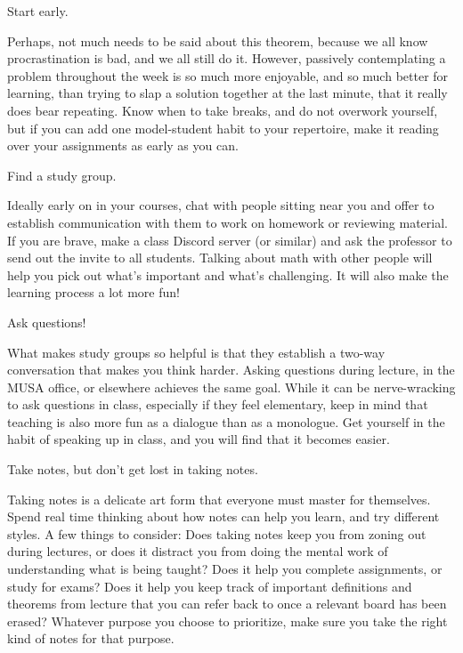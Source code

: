 \documentclass[../notes.tex]{subfiles}
\begin{document}
\begin{proposition}
    Start early.
\end{proposition}
Perhaps, not much needs to be said about this theorem, because we all know procrastination is bad, and we all still do it. However, passively contemplating a problem throughout the week is so much more enjoyable, and so much better for learning, than trying to slap a solution together at the last minute, that it really does bear repeating. Know when to take breaks, and do not overwork yourself, but if you can add one model-student habit to your repertoire, make it reading over your assignments as early as you can.
\begin{proposition}
    Find a study group.
\end{proposition}
Ideally early on in your courses, chat with people sitting near you and offer to establish communication with them to work on homework or reviewing material. If you are brave, make a class Discord server (or similar) and ask the professor to send out the invite to all students. Talking about math with other people will help you pick out what's important and what's challenging. It will also make the learning process a lot more fun!
\begin{corollary}
    Ask questions!
\end{corollary}
What makes study groups so helpful is that they establish a two-way conversation that makes you think harder. Asking questions during lecture, in the MUSA office, or elsewhere achieves the same goal. While it can be nerve-wracking to ask questions in class, especially if they feel elementary, keep in mind that teaching is also more fun as a dialogue than as a monologue. Get yourself in the habit of speaking up in class, and you will find that it becomes easier.
\begin{proposition}
    Take notes, but don't get lost in taking notes.
\end{proposition}
Taking notes is a delicate art form that everyone must master for themselves. Spend real time thinking about how notes can help you learn, and try different styles. A few things to consider: Does taking notes keep you from zoning out during lectures, or does it distract you from doing the mental work of understanding what is being taught? Does it help you complete assignments, or study for exams? Does it help you keep track of important definitions and theorems from lecture that you can refer back to once a relevant board has been erased? Whatever purpose you choose to prioritize, make sure you take the right kind of notes for that purpose.
\end{document}
